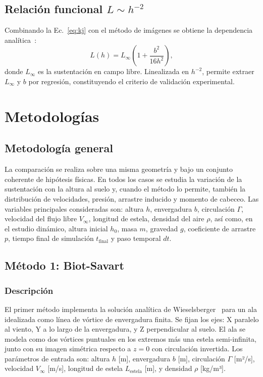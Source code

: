 \documentclass[twocolumn]{article}
\begin{document}
\subsection{Relación funcional $L \sim h^{-2}$}

Combinando la Ec.~\eqref{eq:kj} con el método de imágenes se obtiene la dependencia analítica~\cite{wieselsberger1922}:
\begin{equation}
    L(h) = L_{\infty} \left( 1 + \frac{b^2}{16h^2} \right),
    \label{eq:lift_h}
\end{equation}
donde $L_\infty$ es la sustentación en campo libre. Linealizada en $h^{-2}$, permite extraer $L_\infty$ y $b$ por regresión, constituyendo el criterio de validación experimental.

\section{Metodologías}

\subsection{Metodología general}
La comparación se realiza sobre una misma geometría y bajo un conjunto coherente de hipótesis físicas. En todos los casos se estudia la variación de la sustentación con la altura al suelo y, cuando el método lo permite, también la distribución de velocidades, presión, arrastre inducido y momento de cabeceo. Las variables principales consideradas son: altura $h$, envergadura $b$, circulación $\Gamma$, velocidad del flujo libre $V_{\infty}$, longitud de estela, densidad del aire $\rho$, así como, en el estudio dinámico, altura inicial $h_0$, masa $m$, gravedad $g$, coeficiente de arrastre $p$, tiempo final de simulación $t_{\mathrm{final}}$ y paso temporal $dt$.

\subsection{Método 1: Biot-Savart}

\subsubsection{Descripción}

El primer método implementa la solución analítica de Wieselsberger~\cite{wieselsberger1922} para un ala idealizada como línea de vórtice de envergadura finita. Se fijan los ejes: X paralelo al viento, Y a lo largo de la envergadura, y Z perpendicular al suelo. El ala se modela como dos vórtices puntuales en los extremos más una estela semi-infinita, junto con su imagen simétrica respecto a $z = 0$ con circulación invertida. Los parámetros de entrada son: altura $h$ [m], envergadura $b$ [m], circulación $\Gamma$ [m²/s], velocidad $V_\infty$ [m/s], longitud de estela $L_{\text{estela}}$ [m], y densidad $\rho$ [kg/m³].
\end{document}
